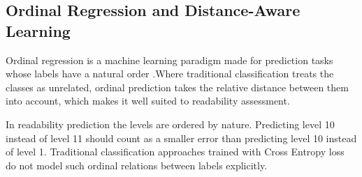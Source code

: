 \documentclass[12pt]{report}
\begin{document}
\subsection{Ordinal Regression and Distance-Aware Learning}

Ordinal regression is a machine learning paradigm made for prediction tasks whose labels have a natural order \cite{gutierrez2016ordinal}.Where traditional classification treats the classes as unrelated, ordinal prediction takes the relative distance between them into account, which makes it well suited to readability assessment.

In readability prediction the levels are ordered by nature. Predicting level 10 instead of level 11 should count as a smaller error than predicting level 10 instead of level 1. Traditional classification approaches trained with Cross Entropy loss do not model such ordinal relations between labels explicitly.
\end{document}
